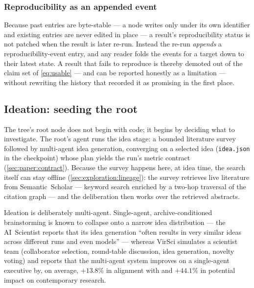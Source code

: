 \subsubsection*{Reproducibility as an appended event}

Because past entries are byte-stable --- a node writes only under its own
identifier and existing entries are never edited in place --- a result's
reproducibility status is not patched when the result is later re-run.
Instead the re-run \emph{appends} a reproducibility-event entry, and any
reader folds the events for a target down to their latest state. A result
that fails to reproduce is thereby demoted out of the claim set of
\cref{eq:usable} --- and can be reported honestly as a limitation ---
without rewriting the history that recorded it as promising in the first
place.

\subsection{Ideation: seeding the root}\label{sec:exploration:ideation}

The tree's root node does not begin with code; it begins by deciding
what to investigate. The root's agent runs the idea stage: a bounded
literature survey followed by multi-agent idea generation, converging
on a selected idea (\texttt{idea.json} in the checkpoint) whose plan
yields the run's metric contract (\cref{sec:paper:contract}). Because
the survey happens here, at idea time, the search itself can stay
offline (\cref{sec:exploration:lineage}): the survey retrieves live
literature from Semantic~Scholar --- keyword search enriched by a
two-hop traversal of the citation graph --- and the deliberation then
works over the retrieved abstracts.

Ideation is deliberately multi-agent. Single-agent,
archive-conditioned brainstorming is known to collapse onto a narrow
idea distribution --- the AI~Scientist reports that its idea
generation ``often results in very similar ideas across different
runs and even models'' \cite{lu2024ai} --- whereas VirSci
\cite{su2024many} simulates a scientist team (collaborator selection,
round-table discussion, idea generation, novelty voting) and reports
that the multi-agent system improves on a single-agent executive by,
on average, $+13.8\%$ in alignment with and $+44.1\%$ in potential
impact on contemporary research.

